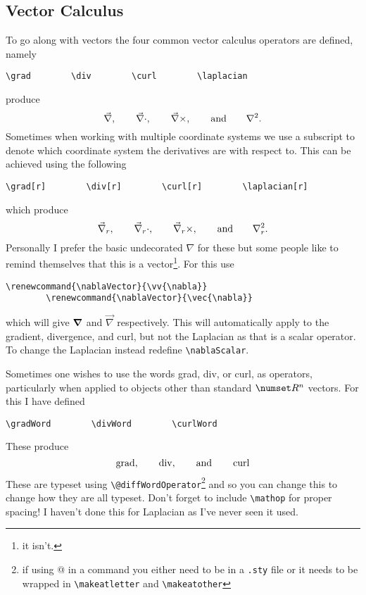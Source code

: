 \documentclass[fleqn, a4paper, openany]{memoir}
\begin{document}
    \subsection{Vector Calculus}
    To go along with vectors the four common vector calculus operators are defined, namely
    \begin{Verbatim}[gobble=2]
        \grad        \div        \curl        \laplacian
    \end{Verbatim}
    produce
    \begin{equation}
        \grad, \qquad \div, \qquad \curl, \qquad\text{and}\qquad \laplacian.
    \end{equation}
    Sometimes when working with multiple coordinate systems we use a subscript to denote which coordinate system the derivatives are with respect to.
    This can be achieved using the following
    \begin{Verbatim}[gobble=2]
        \grad[r]        \div[r]        \curl[r]        \laplacian[r]
    \end{Verbatim}
    which produce
    \begin{equation}
        \grad[r], \qquad \div[r], \qquad \curl[r], \qquad\text{and}\qquad \laplacian[r].
    \end{equation}
    Personally I prefer the basic undecorated \(\nabla\) for these but some people like to remind themselves that this is a vector\footnote{it isn't.}.
    For this use
    \begin{Verbatim}[gobble=2]
        \renewcommand{\nablaVector}{\vv{\nabla}}
        \renewcommand{\nablaVector}{\vec{\nabla}}
    \end{Verbatim}
    which will give \(\bm{\nabla}\) and \(\vec{\nabla}\) respectively.
    This will automatically apply to the gradient, divergence, and curl, but not the Laplacian as that is a scalar operator.
    To change the Laplacian instead redefine \verb*|\nablaScalar|.
    
    Sometimes one wishes to use the words grad, div, or curl, as operators, particularly when applied to objects other than standard \(\reals^n\) vectors.
    For this I have defined
    \begin{Verbatim}[gobble=2]
        \gradWord        \divWord        \curlWord
    \end{Verbatim}
    These produce
    \begin{equation}
        \mathop{\mathrm{grad}}, \qquad \mathop{\mathrm{div}}, \qquad\text{and}\qquad \mathop{\mathrm{curl}}
    \end{equation}
    These are typeset using \verb*|\@diffWordOperator|\footnote{if using @ in a command you either need to be in a \texttt{.sty} file or it needs to be wrapped in \texttt{\textbackslash{}makeatletter} and \texttt{\textbackslash{}makeatother}} and so you can change this to change how they are all typeset.
    Don't forget to include \verb*|\mathop| for proper spacing!
    I haven't done this for Laplacian as I've never seen it used.
    
\end{document}
